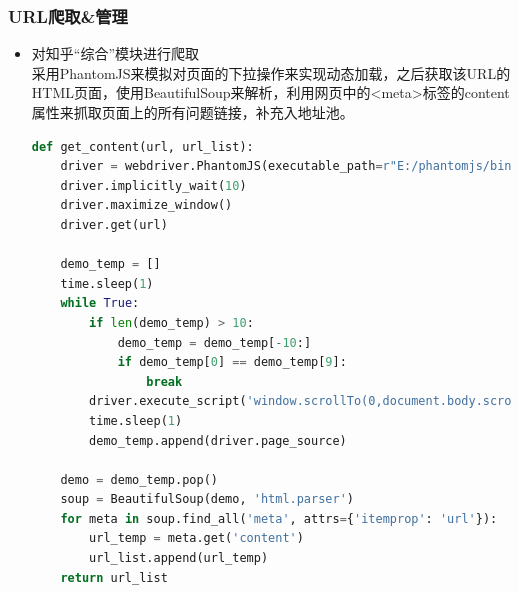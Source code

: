 \documentclass[UTF-8,a4paper, 12pt]{article}
\numberwithin{equation}{section}
\begin{document}
\subsubsection{URL爬取\&管理}
\begin{itemize}
  \item 对知乎“综合”模块进行爬取 \\
  采用PhantomJS来模拟对页面的下拉操作来实现动态加载，之后获取该URL的HTML页面，使用BeautifulSoup来解析，利用网页中的<meta>标签的content属性来抓取页面上的所有问题链接，补充入地址池。
  \begin{lstlisting}[language=python]
  def get_content(url, url_list):
    driver = webdriver.PhantomJS(executable_path=r"E:/phantomjs/bin/phantomjs.exe")
    driver.implicitly_wait(10)
    driver.maximize_window()
    driver.get(url)

    demo_temp = []
    time.sleep(1)
    while True:
        if len(demo_temp) > 10:
            demo_temp = demo_temp[-10:]
            if demo_temp[0] == demo_temp[9]:
                break
        driver.execute_script('window.scrollTo(0,document.body.scrollHeight)')
        time.sleep(1)
        demo_temp.append(driver.page_source)

    demo = demo_temp.pop()
    soup = BeautifulSoup(demo, 'html.parser')
    for meta in soup.find_all('meta', attrs={'itemprop': 'url'}):
        url_temp = meta.get('content')
        url_list.append(url_temp)
    return url_list


\end{lstlisting}
\end{itemize}
\end{document}
